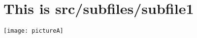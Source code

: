 \documentclass[../../main]{subfiles}
\begin{document}
\section*{This is src/subfiles/subfile1}
\texttt{[image: pictureA]}
\end{document}

